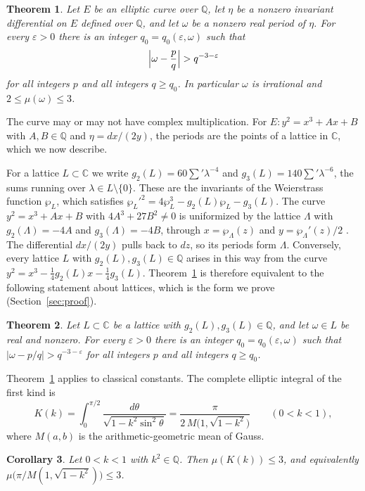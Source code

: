 \documentclass[11pt]{amsart}
\newtheorem{theorem}{Theorem}[section]
\newtheorem{corollary}[theorem]{Corollary}
\theoremstyle{definition}
\theoremstyle{remark}
\numberwithin{equation}{section}
\newcommand{\Q}{\mathbb Q}
\newcommand{\C}{\mathbb C}
\begin{document}
\begin{theorem}\label{cor:curve}
Let $E$ be an elliptic curve over $\Q$, let $\eta$ be a nonzero invariant differential on $E$ defined over $\Q$,
and let $\omega$ be a nonzero real period of $\eta$. For every $\varepsilon>0$ there is an integer
$q_0=q_0(\varepsilon,\omega)$ such that
\[
 \Bigl|\omega-\frac pq\Bigr|>q^{-3-\varepsilon}
\]
for all integers $p$ and all integers $q\ge q_0$. In particular $\omega$ is irrational and
$2\le\mu(\omega)\le3$.
\end{theorem}

The curve may or may not have complex multiplication. For $E:y^2=x^3+Ax+B$ with $A,B\in\Q$ and $\eta=dx/(2y)$,
the periods are the points of a lattice in $\C$, which we now describe.

For a lattice $L\subset\C$ we write $g_2(L)=60\sum'\lambda^{-4}$ and $g_3(L)=140\sum'\lambda^{-6}$, the sums
running over $\lambda\in L\setminus\{0\}$. These are the invariants of the Weierstrass function $\wp_L$, which
satisfies $\wp_L'^2=4\wp_L^3-g_2(L)\wp_L-g_3(L)$. The curve $y^2=x^3+Ax+B$ with $4A^3+27B^2\ne0$ is uniformized
by the lattice $\Lambda$ with $g_2(\Lambda)=-4A$ and $g_3(\Lambda)=-4B$, through $x=\wp_\Lambda(z)$ and
$y=\wp_\Lambda'(z)/2$ \cite[Section~VI.5]{Silverman09}. The differential $dx/(2y)$ pulls back to $dz$, so its
periods form $\Lambda$. Conversely, every lattice $L$ with $g_2(L),g_3(L)\in\Q$ arises in this way from the curve
$y^2=x^3-\tfrac14g_2(L)x-\tfrac14g_3(L)$. Theorem~\ref{cor:curve} is therefore equivalent to the following
statement about lattices, which is the form we prove (Section~\ref{sec:proof}).

\begin{theorem}\label{thm:main}
Let $L\subset\C$ be a lattice with $g_2(L),g_3(L)\in\Q$, and let $\omega\in L$ be real and nonzero. For every
$\varepsilon>0$ there is an integer $q_0=q_0(\varepsilon,\omega)$ such that
$|\omega-p/q|>q^{-3-\varepsilon}$ for all integers $p$ and all integers $q\ge q_0$.
\end{theorem}

Theorem~\ref{cor:curve} applies to classical constants. The complete elliptic integral of the first kind is
\[
 K(k)=\int_0^{\pi/2}\frac{d\theta}{\sqrt{1-k^2\sin^2\theta}}=\frac{\pi}{2\,M\bigl(1,\sqrt{1-k^2}\bigr)}\qquad(0<k<1),
\]
where $M(a,b)$ is the arithmetic-geometric mean of Gauss.

\begin{corollary}\label{cor:K}
Let $0<k<1$ with $k^2\in\Q$. Then $\mu(K(k))\le3$, and equivalently $\mu\bigl(\pi/M(1,\sqrt{1-k^2})\bigr)\le3$.
\end{corollary}
\end{document}
